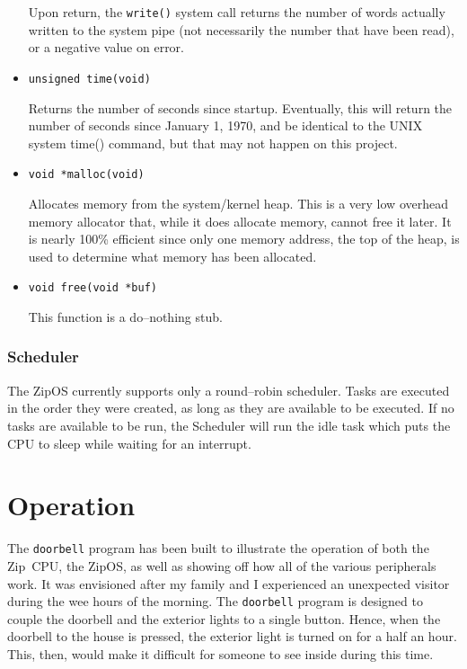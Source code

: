 \documentclass{gqtekspec}
\begin{document}
\begin{itemize}
	Upon return, the {\tt write()} system call returns the number of words
	actually written to the system pipe (not necessarily the number that
	have been read), or a negative value on error.

\item {\tt unsigned time(void) }

	Returns the number of seconds since startup.  Eventually, this will
	return the number of seconds since January 1, 1970, and be identical
	to the UNIX system time() command, but that may not happen on this
	project.


\item {\tt void *malloc(void)}

	Allocates memory from the system/kernel heap.  This is a very low
	overhead memory allocator that, while it does allocate memory, cannot
	free it later.  It is nearly 100\% efficient since only one memory
	address, the top of the heap, is used to determine what memory has
	been allocated.

\item {\tt void free(void *buf)}

	This function is a do--nothing stub.

\end{itemize}
\subsection{Scheduler}
The ZipOS currently supports only a round--robin scheduler.  Tasks are executed
in the order they were created, as long as they are available to be executed.
If no tasks are available to be run, the Scheduler will run the idle task which
puts the CPU to sleep while waiting for an interrupt.

\chapter{Operation}
The {\tt doorbell} program has been built to illustrate the operation of both
the Zip~CPU, the ZipOS, as well as showing off how all of the various
peripherals work.  It was envisioned after my family and I experienced an 
unexpected visitor during the wee hours of the morning.  The {\tt doorbell}
program is designed to couple the doorbell and the exterior lights to a 
single button.  Hence, when the doorbell to the house is pressed, the exterior
light is turned on for a half an hour.  This, then, would make it difficult
for someone to see inside during this time.
\end{document}
